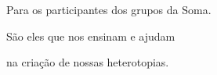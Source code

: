 \pagebreak
\thispagestyle{empty}

\begin{vplace}[30]
\begin{flushright}
Para os participantes dos grupos da Soma.

São eles que nos ensinam e ajudam

na criação de nossas heterotopias.
\end{flushright}
\end{vplace}







